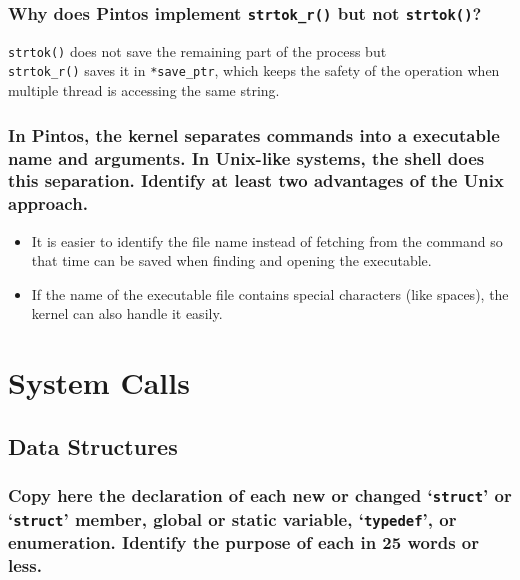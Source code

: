 \documentclass[sigconf, nonacm, balance=false, urlbreakonhyphens=true]{acmart}
\begin{document}
            \subsubsection{Why does Pintos implement \texttt{strtok\_r()} but not \texttt{strtok()}?} 

                \texttt{strtok()} does not save the remaining part of the process but \\\texttt{strtok\_r()} saves it in \texttt{*save\_ptr}, which keeps the safety of the operation when multiple thread is accessing the same string. 

            \subsubsection{In Pintos, the kernel separates commands into a executable name and arguments.  In Unix-like systems, the shell does this separation.  Identify at least two advantages of the Unix approach.} 

            \begin{itemize}
                \item It is easier to identify the file name instead of fetching from the command so that time can be saved when finding and opening the executable. 
                \item If the name of the executable file contains special characters (like spaces), the kernel can also handle it easily. 
            \end{itemize}
    
    \section{System Calls}

        \label{System Calls}

        \subsection{Data Structures}
            
            \subsubsection{Copy here the declaration of each new or changed `\texttt{struct}' or `\texttt{struct}' member, global or static variable, `\texttt{typedef}', or enumeration. Identify the purpose of each in 25 words or less. } 
\end{document}
